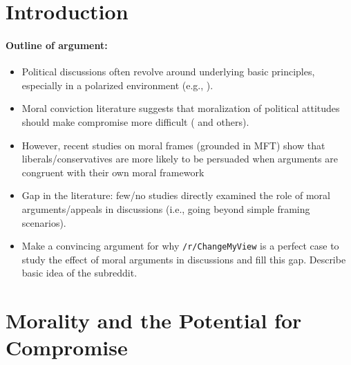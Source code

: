 \section{Introduction}

\paragraph{Outline of argument:}
\begin{itemize}
\item Political discussions often revolve around underlying basic principles, especially in a polarized environment (e.g., \citealt{garrett2018moral}).
\item Moral conviction literature suggests that moralization of political attitudes should make compromise more difficult (\citealt{ryan2016no} and others).
\item However, recent studies on moral frames (grounded in MFT) show that liberals/conservatives are more likely to be persuaded when arguments are congruent with their own moral framework \citep{koleva2012tracing,kidwell2013getting}
\item Gap in the literature: few/no studies directly examined the role of moral arguments/appeals in discussions (i.e., going beyond simple framing scenarios).
\item Make a convincing argument for why \texttt{/r/ChangeMyView} is a perfect case to study the effect of moral arguments in discussions and fill this gap. Describe basic idea of the subreddit.
\end{itemize}


\section{Morality and the Potential for Compromise}


